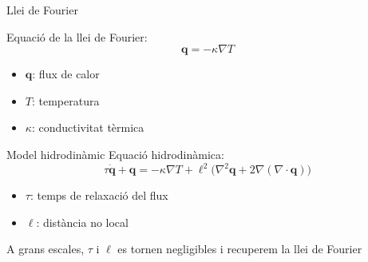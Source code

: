 \documentclass{beamer}
\begin{document}
\begin{frame}{Llei de Fourier}

\begin{figure}
\begin{center}

\end{center}
\end{figure}
\pause
Equaci\'{o} de la llei de Fourier:
\[\boldsymbol{q}=-\kappa\nabla T\]
\pause
\vspace{-6mm}
\begin{itemize}
\item $\boldsymbol{q}$: flux de calor
\pause
\item $T$: temperatura
\pause
\item $\kappa$: conductivitat t\`{e}rmica
\end{itemize}
\end{frame}

%
%
%
%
%
%
\begin{frame}{Model hidrodin\`{a}mic}
Equaci\'{o} hidrodin\`{a}mica:
\[\tau\dot{\boldsymbol{q}}+\boldsymbol{q}=-\kappa\nabla T+\ell^2\big(\nabla^2\boldsymbol{q}+2\nabla(\nabla\cdot\boldsymbol{q})\big)\]
\pause
\begin{itemize}
\item $\tau$: temps de relaxaci\'{o} del flux
\pause
\item $\ell$: dist\`{a}ncia no local
\end{itemize}
\pause
\vspace{4mm}

%
A grans escales, $\tau$ i $\ell$ es tornen negligibles i recuperem la llei de Fourier
\end{frame}
\end{document}
